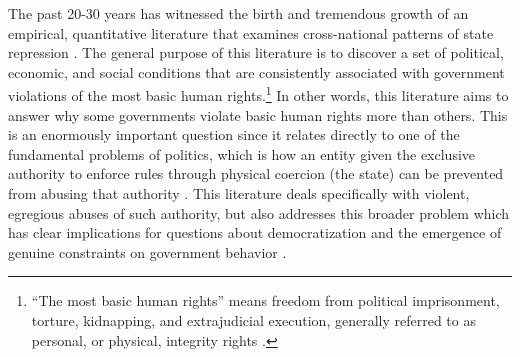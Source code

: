 \documentclass[12pt]{article}
\begin{document}
The past 20-30 years has witnessed the birth and tremendous growth of an empirical, quantitative literature that examines cross-national patterns of state repression \citep[See, e.g.,][]{Stohletal1986, Park1987, McCormickMitchell1988, Henderson1991, Henderson1993, PoeTate1994, Davenport1995, Fein1995, Davenport1999, CingranelliRichards1999isq, Keith1999, Poeetal1999, Apodaca2001, RichardsGellenySacko2001,  Hathaway2002, Keith2002PRQ, DavenportArmstrong2004, BDMetal2005, HafnerBurton2005jpr, HafnerBurtonTsutsui2005, Davenport2007AR, Davenport2007, KeithTatePoe2009, CingranelliFilippov2010, ConradMoore2010}. The general purpose of this literature is to discover a set of political, economic, and social conditions that are consistently associated with government violations of the most basic human rights.\footnote{``The most basic human rights'' means freedom from political imprisonment, torture, kidnapping, and extrajudicial execution, generally referred to as personal, or physical, integrity rights \citep[See, e.g.][]{PoeTate1994, CingranelliRichards1999isq}.} In other words, this literature aims to answer why some governments violate basic human rights more than others. This is an enormously important question since it relates directly to one of the fundamental problems of politics, which is how an entity given the exclusive authority to enforce rules through physical coercion (the state) can be prevented from abusing that authority \citep[See, e.g.,][]{Moore2010}. This literature deals specifically with violent, egregious abuses of such authority, but also addresses this broader problem which has clear implications for questions about democratization and the emergence of genuine constraints on government behavior \citep[E.g.,][]{NorthWeingast1989,Weingast1997}.
\end{document}
